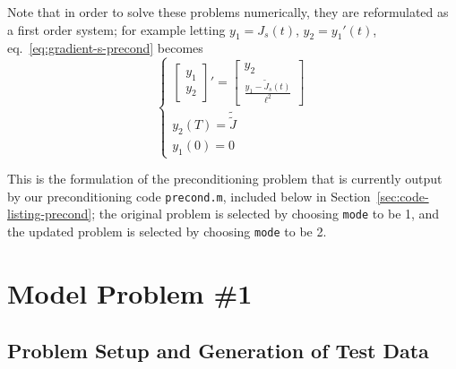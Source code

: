 \documentclass[letterpaper, 10pt, draft]{amsart}
\theoremstyle{definition}
\theoremstyle{remark}
\begin{document}
Note that in order to solve these problems numerically, they are reformulated as
a first order system; for example letting $y_1 = J_s(t)$, $y_2 = y_1'(t)$,
eq.~\eqref{eq:gradient-s-precond} becomes
\begin{equation}
  \begin{cases}
    \begin{bmatrix}
      y_1
      \\
      y_2
    \end{bmatrix}'
    = \begin{bmatrix}
      y_2
      \\
      \frac{y_1 - \tilde{J}_s(t)}{\ell^2}
    \end{bmatrix}
    \\
    y_2(T) = \tilde{\tilde{J}}
    \\
    y_1(0) = 0
  \end{cases}
\end{equation}

This is the formulation of the preconditioning problem that is currently output
by our preconditioning code \verb+precond.m+, included below in
Section~\ref{sec:code-listing-precond}; the original problem is selected by
choosing \verb+mode+ to be 1, and the updated problem is selected by choosing
\verb+mode+ to be 2.


\section{Model Problem \#1}\label{sec:model-problem-1}

\subsection{Problem Setup and Generation of Test Data}
\end{document}
